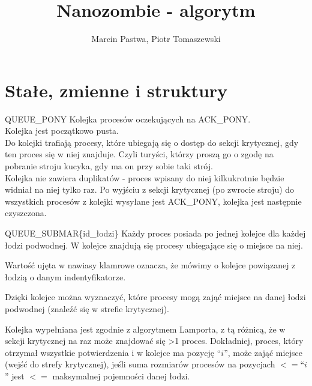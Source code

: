 \documentclass{beamer}
\title[Nanozombie]{Nanozombie - algorytm}
\author{Marcin Pastwa, Piotr Tomaszewski}
\date{}
\begin{document}
\begin{frame}
  \titlepage
\end{frame}

\section{Stałe, zmienne i struktury}

\begin{frame}{QUEUE\_PONY}
\internallinenumbers
    \resetlinenumber[1]
    Kolejka procesów oczekujących na ACK\_PONY. \\
    Kolejka jest początkowo pusta. \\
    Do kolejki trafiają procesy, które ubiegają się o dostęp do sekcji krytycznej, gdy ten proces się w niej znajduje. Czyli turyści, którzy proszą go o zgodę na pobranie stroju kucyka, gdy ma on przy sobie taki strój. \\
    Kolejka nie zawiera duplikatów - proces wpisany do niej kilkukrotnie będzie widniał na niej tylko raz.
    Po wyjściu z sekcji krytycznej (po zwrocie stroju) do wszystkich procesów z kolejki wysyłane jest ACK\_PONY, kolejka jest następnie czyszczona.
\end{frame}

\begin{frame}{QUEUE\_SUBMAR\{id\_łodzi\}}
    \internallinenumbers
    \resetlinenumber[1]
    Każdy proces posiada po jednej kolejce dla każdej łodzi podwodnej.
    W kolejce znajdują się procesy ubiegające się o miejsce na niej.

    \vspace{0.2cm}
    Wartość ujęta w nawiasy klamrowe oznacza, że mówimy o kolejce powiązanej z łodzią o danym indentyfikatorze.

    \vspace{0.2cm}
    Dzięki kolejce można wyznaczyć, które procesy mogą zająć miejsce na danej łodzi podwodnej (znaleźć się w strefie krytycznej).

    \vspace{0.2cm}
    Kolejka wypełniana jest zgodnie z algorytmem Lamporta, z tą różnicą, że w sekcji krytycznej na raz może znajdować się >1 proces. Dokładniej, proces, który otrzymał wszystkie potwierdzenia i w kolejce ma pozycję ``$i$'', może zająć miejsce (wejść do strefy krytycznej), jeśli suma rozmiarów procesów na pozycjach $<=$``$i$'' jest $<=$ maksymalnej pojemności danej łodzi.
\end{frame}
\end{document}

